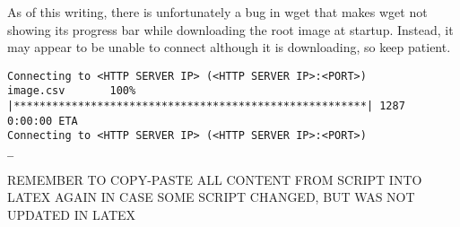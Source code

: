 As of this writing, there is unfortunately a bug in wget that makes wget not showing
its progress bar while downloading the root image at startup. Instead, it may appear
to be unable to connect although it is downloading, so keep patient.

\begin{lstlisting}[]
Connecting to <HTTP SERVER IP> (<HTTP SERVER IP>:<PORT>)
image.csv       100% |*******************************************************| 1287   0:00:00 ETA
Connecting to <HTTP SERVER IP> (<HTTP SERVER IP>:<PORT>)
_
\end{lstlisting}
\FloatBarrier
\vspace{-5mm}


REMEMBER TO COPY-PASTE ALL CONTENT FROM SCRIPT INTO LATEX AGAIN IN CASE SOME
SCRIPT CHANGED, BUT WAS NOT UPDATED IN LATEX
